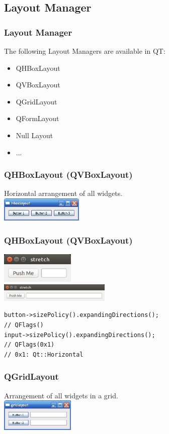 \subsection{Layout Manager}
\frame
{
\frametitle{Layout Manager}
The following Layout Managers are available in QT:
\begin{itemize}
\item QHBoxLayout
\item QVBoxLayout
\item QGridLayout
\item QFormLayout
\item Null Layout
\item ...
\end{itemize}
}

\begin{frame}[fragile]
\frametitle{QHBoxLayout (QVBoxLayout)}
Horizontal arrangement of all widgets.\\
\includegraphics[width=112pt]{code/qt/hbox/hboxlayout.jpg}\\
{\tiny

}
\end{frame}

\begin{frame}[fragile]
\frametitle{QHBoxLayout (QVBoxLayout)}
\includegraphics[width=100pt]{code/qt/stretch/stretch1.png}\\
\includegraphics[width=150pt]{code/qt/stretch/stretch2.png}\\
\begin{lstlisting}
button->sizePolicy().expandingDirections();
// QFlags()
input->sizePolicy().expandingDirections();
// QFlags(0x1)
// 0x1: Qt::Horizontal
\end{lstlisting}
\end{frame}

\frame
{
\frametitle{QGridLayout}
Arrangement of all widgets in a grid.\\
\includegraphics[width=100pt]{code/qt/grid/gridlayout.jpg}\\
{\tiny

}
}

